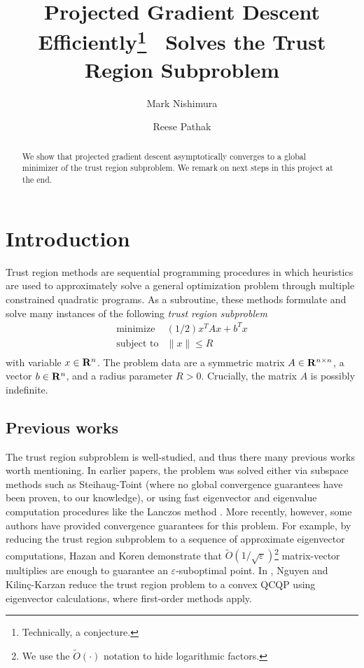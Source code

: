 \documentclass[11pt]{article}
\title{Projected Gradient Descent Efficiently\footnote{Technically, a conjecture.}~ Solves the Trust Region Subproblem}
\author{Mark Nishimura \and Reese Pathak}
\let\epsilon\varepsilon
\begin{document}
\maketitle

\begin{abstract}
We show that projected gradient descent asymptotically converges to a global minimizer of 
the trust region subproblem.
We remark on next steps in this project at the end.
\end{abstract}


\section{Introduction}
Trust region methods are sequential programming procedures in which heuristics are used to approximately solve a general optimization problem through multiple constrained quadratic programs. As a subroutine, these methods formulate and solve many instances of the following \emph{trust region subproblem}
\begin{equation}\label{problem:TR}
\begin{array}{ll} 
\mbox{minimize} & (1/2)x^TAx + b^T x \\
\mbox{subject to} & 
\|x\| \leq R\\
\end{array}
\end{equation}
with variable $x \in \mathbf{R}^n$. 
The problem data are a symmetric matrix $A \in \mathbf{R}^{n \times n}$, a vector $b \in \mathbf{R}^n$, and a radius parameter $R > 0$. Crucially, the matrix $A$ is possibly indefinite. 
\subsection{Previous works}
The trust region subproblem is well-studied, and thus there many previous works worth mentioning. In earlier papers, the problem was solved either via subspace methods such as Steihaug-Toint (where no global convergence guarantees have been proven, to our knowledge), or using fast eigenvector and eigenvalue computation procedures like the Lanczos method \cite{conn2000, erway2009, gould1999, gould2010}. More recently, however, some authors have provided convergence guarantees for this problem. For example, by reducing the trust region subproblem to a sequence of approximate eigenvector computations, Hazan and Koren \cite{hazan2016}
demonstrate that $\tilde O(1/\sqrt{\epsilon})$\footnote{We use the $\tilde O(\cdot)$ notation to hide logarithmic factors.} matrix-vector multiplies are enough to guarantee an 
$\epsilon$-suboptimal point. In \cite{nguyen2017}, Nguyen and Kilin{\c{c}}{-}Karzan reduce the trust region problem to a convex QCQP using eigenvector calculations, where first-order methods apply. 
\end{document}
